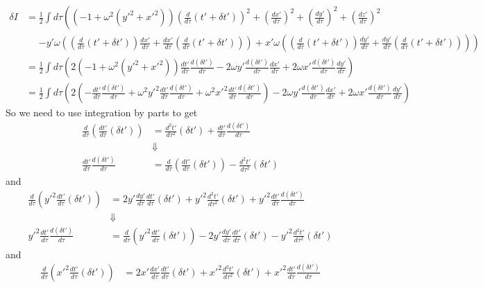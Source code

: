 \documentclass[11pt]{article}
\numberwithin{equation}{section}
\begin{document}
\begin{enumerate}[(a)]
\begin{align*}
\delta I &= \frac{1}{2}\int d\tau \left(\left(-1 + \omega^2(y'^2 + x'^2)\right)\left(\frac{d}{d\tau}(t'+\delta t')\right)^2 + \left(\frac{dx'}{d\tau}\right)^2 + \left(\frac{dy'}{d\tau}\right)^2  + \left(\frac{dz'}{d\tau}\right)^2\right.\\
&\ \ \ \ \ \ \left. - y'\omega\left(\left(\frac{d}{d\tau}(t'+\delta t')\right)\frac{dx'}{d\tau} + \frac{dx'}{d\tau}\left(\frac{d}{d\tau}(t'+\delta t')\right)\right) + x'\omega \left(\left(\frac{d}{d\tau}(t'+\delta t')\right)\frac{dy'}{d\tau} + \frac{dy'}{d\tau}\left(\frac{d}{d\tau}(t'+\delta t')\right)\right)\right)\\
&= \frac{1}{2}\int d\tau \left(2\left(-1 + \omega^2(y'^2 + x'^2)\right)\frac{dt'}{d\tau}\frac{d(\delta t')}{d\tau}  - 2\omega y'\frac{d(\delta t')}{d\tau}\frac{dx'}{d\tau} + 2\omega x'\frac{d(\delta t')}{d\tau}\frac{dy'}{d\tau}\right)\\
&= \frac{1}{2}\int d\tau \left(2\left(-\frac{dt'}{d\tau}\frac{d(\delta t')}{d\tau} + \omega^2y'^2\frac{dt'}{d\tau}\frac{d(\delta t')}{d\tau} + \omega^2x'^2\frac{dt'}{d\tau}\frac{d(\delta t')}{d\tau}\right)  - 2\omega y'\frac{d(\delta t')}{d\tau}\frac{dx'}{d\tau} + 2\omega x'\frac{d(\delta t')}{d\tau}\frac{dy'}{d\tau}\right)
\end{align*}
So we need to use integration by parts to get
\begin{align*}
\frac{d}{d\tau}\left(\frac{dt'}{d\tau}(\delta t')\right) &= \frac{d^2t'}{d\tau^2}(\delta t') + \frac{dt'}{d\tau}\frac{d(\delta t')}{d\tau}\\
&\Downarrow\\
\frac{dt'}{d\tau}\frac{d(\delta t')}{d\tau} &= \frac{d}{d\tau}\left(\frac{dt'}{d\tau}(\delta t')\right) - \frac{d^2t'}{d\tau^2}(\delta t') 
\end{align*}
and
\begin{align*}
\frac{d}{d\tau}\left(y'^2\frac{dt'}{d\tau}(\delta t')\right) &= 2y'\frac{dy'}{d\tau}\frac{dt'}{d\tau}(\delta t') + y'^2\frac{d^2t'}{d\tau^2}(\delta t') + y'^2\frac{dt'}{d\tau}\frac{d(\delta t')}{d\tau}\\
&\Downarrow\\
y'^2\frac{dt'}{d\tau}\frac{d(\delta t')}{d\tau} &= \frac{d}{d\tau}\left(y'^2\frac{dt'}{d\tau}(\delta t')\right) - 2y'\frac{dy'}{d\tau}\frac{dt'}{d\tau}(\delta t') - y'^2\frac{d^2t'}{d\tau^2}(\delta t') 
\end{align*}
and
\begin{align*}
\frac{d}{d\tau}\left(x'^2\frac{dt'}{d\tau}(\delta t')\right) &= 2x'\frac{dx'}{d\tau}\frac{dt'}{d\tau}(\delta t') + x'^2\frac{d^2t'}{d\tau^2}(\delta t') + x'^2\frac{dt'}{d\tau}\frac{d(\delta t')}{d\tau}\\

\end{align*}
\end{enumerate}
\end{document}
